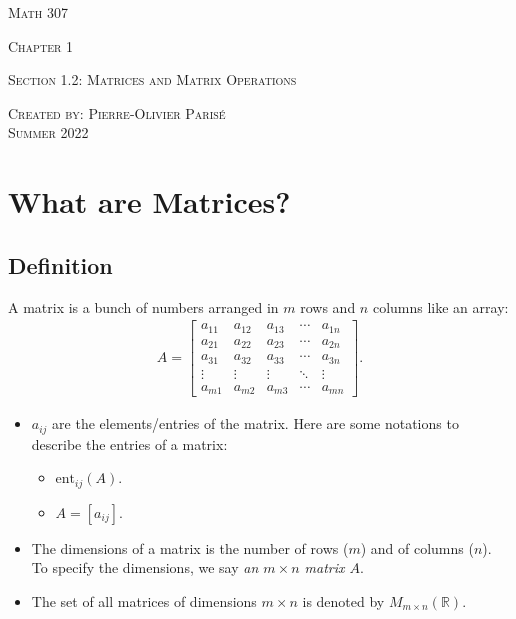 \documentclass[12pt,a4paper]{article}
\begin{document}
\thispagestyle{empty}

\begin{center}
\vspace*{2.5cm}

{\Huge \textsc{Math 307}}

\vspace*{2cm}

{\LARGE \textsc{Chapter 1}} 

\vspace*{0.75cm}

\noindent\textsc{Section 1.2: Matrices and Matrix Operations}

\vspace*{0.75cm}

\tableofcontents

\vfill

\noindent \textsc{Created by: Pierre-Olivier Paris{\'e}} \\
\textsc{Summer 2022}
\end{center}

\newpage

\section{What are Matrices?}

\subsection{Definition}
A matrix is a bunch of numbers arranged in $m$ rows and $n$ columns like an array:
	\begin{align*}
	A = \begin{bmatrix}
	a_{11} & a_{12} & a_{13} & \cdots & a_{1n} \\
	a_{21} & a_{22} & a_{23} & \cdots & a_{2n} \\
	a_{31} & a_{32} & a_{33} & \cdots & a_{3n} \\
	\vdots & \vdots & \vdots & \ddots & \vdots \\
	a_{m1} & a_{m2} & a_{m3} & \cdots & a_{mn}
	\end{bmatrix} .
	\end{align*}

\begin{multicols}{2}
\begin{itemize}
\item $a_{ij}$ are the elements/entries of the matrix. Here are some notations to describe the entries of a matrix:
	\begin{itemize}
	\item $\mathrm{ent}_{ij} (A)$.
	\item $A = [a_{ij}]$.
	\end{itemize}
\item The dimensions of a matrix is the number of rows ($m$) and of columns ($n$). To specify the dimensions, we say \textit{an $m \times n$ matrix $A$}.
\item The set of all matrices of dimensions $m \times n$ is denoted by $M_{m \times n} (\mathbb{R})$.
\end{itemize}
\end{multicols}
\end{document}
